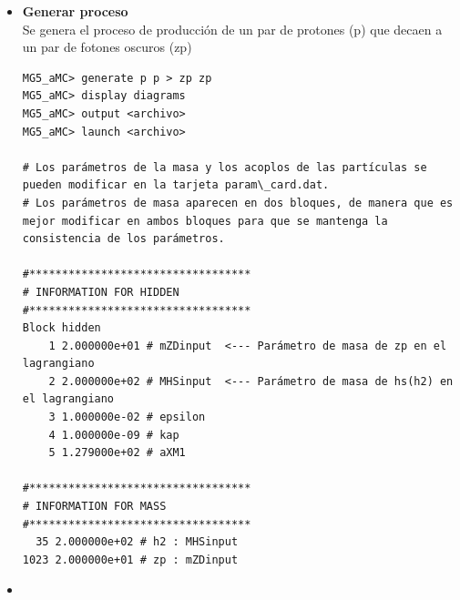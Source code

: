 \begin{itemize}
\begin{lstlisting}
# De esta manera se convierte el modelo a python3 y se puede importar sin problemas
MG5_aMC>import model HAHM_variableMW_v5_UFO
INFO: load particles 
INFO: load vertices 
INFO: Change particles name to pass to MG5 convention 
Kept definitions of multiparticles p / j / l+ / l- / vl / vl~ unchanged
Defined multiparticle all = g a ve vm vt ve~ vm~ vt~ u c t d s b u~ c~ t~ d~ s~ b~ z zp w+ h h2 w- e- mu- ta- e+ mu+ ta+
\end{lstlisting}
    \item[(04)] \textbf{Generar proceso}\\Se genera el proceso de producción de un par de protones (p) que decaen a un par de fotones oscuros (zp)
\begin{lstlisting}
MG5_aMC> generate p p > zp zp
MG5_aMC> display diagrams
MG5_aMC> output <archivo>
MG5_aMC> launch <archivo>

# Los parámetros de la masa y los acoplos de las partículas se pueden modificar en la tarjeta param\_card.dat.
# Los parámetros de masa aparecen en dos bloques, de manera que es mejor modificar en ambos bloques para que se mantenga la consistencia de los parámetros.

#**********************************
# INFORMATION FOR HIDDEN
#**********************************
Block hidden
    1 2.000000e+01 # mZDinput  <--- Parámetro de masa de zp en el lagrangiano
    2 2.000000e+02 # MHSinput  <--- Parámetro de masa de hs(h2) en el lagrangiano
    3 1.000000e-02 # epsilon
    4 1.000000e-09 # kap
    5 1.279000e+02 # aXM1

#**********************************
# INFORMATION FOR MASS
#**********************************
  35 2.000000e+02 # h2 : MHSinput
1023 2.000000e+01 # zp : mZDinput
\end{lstlisting}
    \item[] 
\end{itemize}